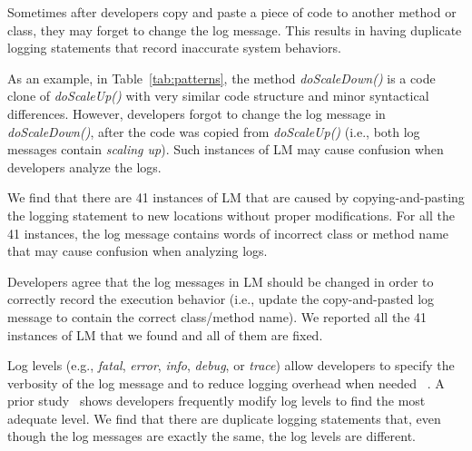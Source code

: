 
Sometimes after developers copy and paste a piece of code to another method or class, they may forget to change the log message. This results in having duplicate logging statements that record inaccurate system behaviors.




 As an example, in Table~\ref{tab:patterns}, the method {\em doScaleDown()} is a code clone of {\em doScaleUp()} with very similar code structure and minor syntactical differences. However, developers forgot to change the log message in {\em doScaleDown()}, after the code was copied from {\em doScaleUp()} (i.e., both log messages contain {\em scaling up}). Such instances of LM may cause confusion when developers analyze the logs.

 We find that there are 41 instances of LM that are caused by copying-and-pasting the logging statement to new locations without proper modifications. For all the 41 instances, the log message contains words of incorrect class or method name that may cause confusion when analyzing logs.

 Developers agree that the log messages in LM should be changed in order to correctly record the execution behavior (i.e., update the copy-and-pasted log message to contain the correct class/method name). We reported all the 41 instances of LM that we found and all of them are fixed. %





Log levels (e.g., {\em fatal}, {\em error}, {\em info}, {\em debug}, or {\em trace}) allow developers to specify the verbosity of the log message and to reduce logging overhead when needed%
~\cite{Li2017}. A prior study~\cite{Yuan:2012:CLP:2337223.2337236} shows developers frequently modify log levels to find the most adequate level. We find that there are duplicate logging statements that, even though the log messages are exactly the same, the log levels are different.

